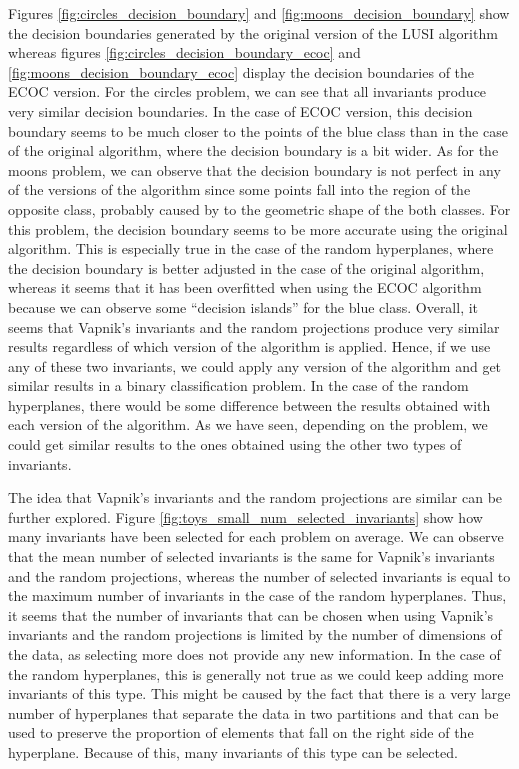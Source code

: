 Figures \ref{fig:circles_decision_boundary} and \ref{fig:moons_decision_boundary} show the decision
boundaries generated by the original version of the LUSI algorithm whereas figures
\ref{fig:circles_decision_boundary_ecoc} and \ref{fig:moons_decision_boundary_ecoc} display the decision
boundaries of the ECOC version. For the circles problem, we can see that all invariants produce
very similar decision boundaries. In the case of ECOC version, this decision boundary seems to be much
closer to the points of the blue class than in the case of the original algorithm, where the decision boundary
is a bit wider. As for the moons problem, we can observe that the decision boundary is not perfect
in any of the versions of the algorithm since some points fall into the region of the opposite class,
probably caused by to the geometric shape of the both classes. For this problem, the decision boundary seems
to be more accurate using the original algorithm. This is especially true in the case of the random hyperplanes,
where the decision boundary is better adjusted in the case of the original algorithm, whereas it seems that it
has been overfitted when using the ECOC algorithm because we can observe some ``decision islands'' for the blue
class. Overall, it seems that Vapnik's invariants and the random projections produce very similar results
regardless of which version of the algorithm is applied. Hence, if we use any of these two invariants, we
could apply any version of the algorithm and get similar results in a binary classification problem. In the
case of the random hyperplanes, there would be some difference between the results obtained with each version
of the algorithm. As we have seen, depending on the problem, we could get similar results to the ones obtained
using the other two types of invariants.

The idea that Vapnik's invariants and the random projections are similar can be further explored. Figure
\ref{fig:toys_small_num_selected_invariants} show how many invariants have been selected for each problem
on average. We can observe that the mean number of selected invariants is the same for Vapnik's invariants
and the random projections, whereas the number of selected invariants is equal to the maximum number of
invariants in the case of the random hyperplanes. Thus, it seems that the number of invariants that can be
chosen when using Vapnik's invariants and the random projections is limited by the number of dimensions of the
data, as selecting more does not provide any new information. In the case of the random hyperplanes, this is
generally not true as we could keep adding more invariants of this type. This might be caused by the
fact that there is a very large number of hyperplanes that separate the data in two partitions and that
can be used to preserve the proportion of elements that fall on the right side of the hyperplane.
Because of this, many invariants of this type can be selected.

